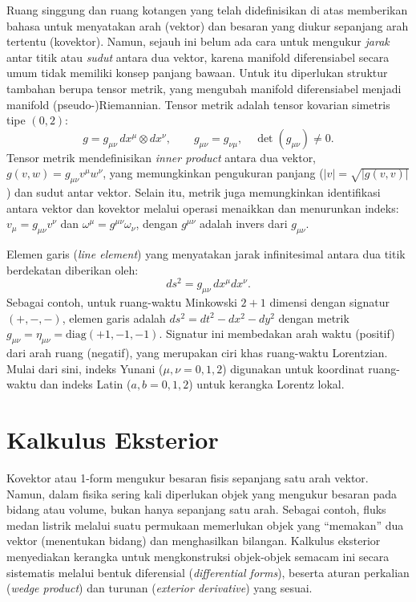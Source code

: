Ruang singgung dan ruang kotangen yang telah didefinisikan di atas memberikan bahasa untuk menyatakan arah (vektor) dan besaran yang diukur sepanjang arah tertentu (kovektor). Namun, sejauh ini belum ada cara untuk mengukur \textit{jarak} antar titik atau \textit{sudut} antara dua vektor, karena manifold diferensiabel secara umum tidak memiliki konsep panjang bawaan. Untuk itu diperlukan struktur tambahan berupa tensor metrik, yang mengubah manifold diferensiabel menjadi manifold (pseudo-)Riemannian. Tensor metrik adalah tensor kovarian simetris tipe $(0,2)$:
\begin{equation}\label{eq:metric}
    g = g_{\mu\nu}\, dx^\mu \otimes dx^\nu, \qquad g_{\mu\nu} = g_{\nu\mu}, \quad \det(g_{\mu\nu}) \neq 0.
\end{equation}
Tensor metrik mendefinisikan \textit{inner product} antara dua vektor, $g(v, w) = g_{\mu\nu} v^\mu w^\nu$, yang memungkinkan pengukuran panjang ($|v| = \sqrt{|g(v,v)|}$) dan sudut antar vektor. Selain itu, metrik juga memungkinkan identifikasi antara vektor dan kovektor melalui operasi menaikkan dan menurunkan indeks: $v_\mu = g_{\mu\nu}v^\nu$ dan $\omega^\mu = g^{\mu\nu}\omega_\nu$, dengan $g^{\mu\nu}$ adalah invers dari $g_{\mu\nu}$.

Elemen garis (\textit{line element}) yang menyatakan jarak infinitesimal antara dua titik berdekatan diberikan oleh:
\begin{equation}
    ds^2 = g_{\mu\nu}\, dx^\mu dx^\nu.
\end{equation}
Sebagai contoh, untuk ruang-waktu Minkowski $2+1$ dimensi dengan signatur $(+,-,-)$, elemen garis adalah $ds^2 = dt^2 - dx^2 - dy^2$ dengan metrik $g_{\mu\nu} = \eta_{\mu\nu} = \mathrm{diag}(+1,-1,-1)$. Signatur ini membedakan arah waktu (positif) dari arah ruang (negatif), yang merupakan ciri khas ruang-waktu Lorentzian. Mulai dari sini, indeks Yunani ($\mu, \nu = 0, 1, 2$) digunakan untuk koordinat ruang-waktu dan indeks Latin ($a, b = 0, 1, 2$) untuk kerangka Lorentz lokal.

\section{Kalkulus Eksterior}
\label{sec:kalkulus-eksterior}

Kovektor atau 1-form mengukur besaran fisis sepanjang satu arah vektor. Namun, dalam fisika sering kali diperlukan objek yang mengukur besaran pada bidang atau volume, bukan hanya sepanjang satu arah. Sebagai contoh, fluks medan listrik melalui suatu permukaan memerlukan objek yang ``memakan'' dua vektor (menentukan bidang) dan menghasilkan bilangan. Kalkulus eksterior menyediakan kerangka untuk mengkonstruksi objek-objek semacam ini secara sistematis melalui bentuk diferensial (\textit{differential forms}), beserta aturan perkalian (\textit{wedge product}) dan turunan (\textit{exterior derivative}) yang sesuai.


